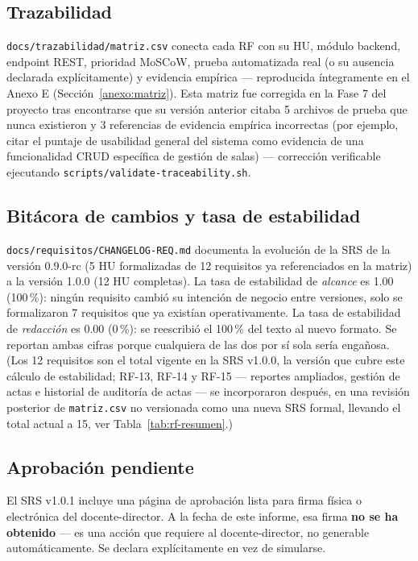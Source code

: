 \subsection{Trazabilidad}

\texttt{docs/trazabilidad/matriz.csv} conecta cada RF con su HU, módulo backend, endpoint REST,
prioridad MoSCoW, prueba automatizada real (o su ausencia declarada explícitamente) y evidencia
empírica --- reproducida íntegramente en el Anexo E (Sección~\ref{anexo:matriz}). Esta matriz fue corregida en la Fase 7 del proyecto tras encontrarse que su versión anterior
citaba 5 archivos de prueba que nunca existieron y 3 referencias de evidencia empírica incorrectas (por
ejemplo, citar el puntaje de usabilidad general del sistema como evidencia de una funcionalidad CRUD
específica de gestión de salas) --- corrección verificable ejecutando
\texttt{scripts/validate-traceability.sh}.

\subsection{Bitácora de cambios y tasa de estabilidad}

\texttt{docs/requisitos/CHANGELOG-REQ.md} documenta la evolución de la SRS de la versión 0.9.0-rc (5 HU
formalizadas de 12 requisitos ya referenciados en la matriz) a la versión 1.0.0 (12 HU completas). La
tasa de estabilidad de \textit{alcance} es 1.00 (100\,\%): ningún requisito cambió su intención de
negocio entre versiones, solo se formalizaron 7 requisitos que ya existían operativamente. La tasa de
estabilidad de \textit{redacción} es 0.00 (0\,\%): se reescribió el 100\,\% del texto al nuevo formato.
Se reportan ambas cifras porque cualquiera de las dos por sí sola sería engañosa. (Los 12 requisitos son
el total vigente en la SRS v1.0.0, la versión que cubre este cálculo de estabilidad; RF-13, RF-14 y RF-15
--- reportes ampliados, gestión de actas e historial de auditoría de actas --- se incorporaron después,
en una revisión posterior de \texttt{matriz.csv} no versionada como una nueva SRS formal, llevando el
total actual a 15, ver Tabla~\ref{tab:rf-resumen}.)

\subsection{Aprobación pendiente}

El SRS v1.0.1 incluye una página de aprobación lista para firma física o electrónica del
docente-director. A la fecha de este informe, esa firma \textbf{no se ha obtenido} --- es una acción que
requiere al docente-director, no generable automáticamente. Se declara explícitamente en vez de
simularse.
\newpage
